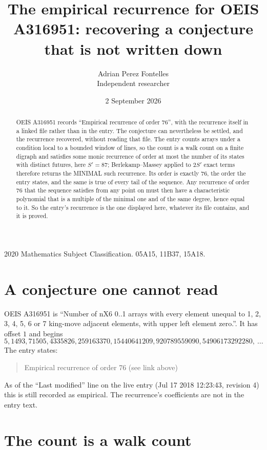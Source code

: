 \documentclass[11pt,a4paper]{article}
\title{The empirical recurrence for OEIS A316951: recovering a conjecture that is not written down}
\author{Adrian Perez Fontelles\\ \small Independent researcher}
\date{2 September 2026}
\theoremstyle{plain}
\theoremstyle{definition}
\begin{document}
\maketitle

\begin{abstract}
OEIS A316951 records ``Empirical recurrence of order $76$'', with the recurrence itself in a
linked file rather than in the entry. The conjecture can nevertheless be settled, and the
recurrence recovered, without reading that file. The entry counts arrays under a condition
local to a bounded window of lines, so the count is a walk count on a finite digraph and
satisfies some monic recurrence of order at most the number of its states with distinct
futures, here $S'=87$; Berlekamp--Massey applied to $2S'$ exact
terms therefore returns the MINIMAL such recurrence. Its order is exactly $76$, the order
the entry states, and the same is true of every tail of the sequence. Any recurrence of order
$76$ that the sequence satisfies from any point on must then have a characteristic
polynomial that is a multiple of the minimal one and of the same degree, hence equal to it. So
the entry's recurrence is the one displayed here, whatever its file contains, and it is
proved.
\end{abstract}

\noindent\small 2020 Mathematics Subject Classification. 05A15, 11B37, 15A18.\normalsize

\section{A conjecture one cannot read}

OEIS A316951 is ``Number of nX6 0..1 arrays with every element unequal to 1, 2, 3, 4, 5, 6 or 7 king-move adjacent elements, with upper left element zero.''. It has offset $1$ and begins
\[
5, 1493, 71505, 4335826, 259163370, 15440641209, 920789559090, 54906173292280,\ \dots
\]
The entry states:
\begin{quote}
Empirical recurrence of order 76 (see link above)
\end{quote}
As of the ``Last modified'' line on the live entry (Jul 17 2018 12:23:43, revision 4) this is still
recorded as empirical. The recurrence's coefficients are not in the entry text.

\section{The count is a walk count}
\end{document}
